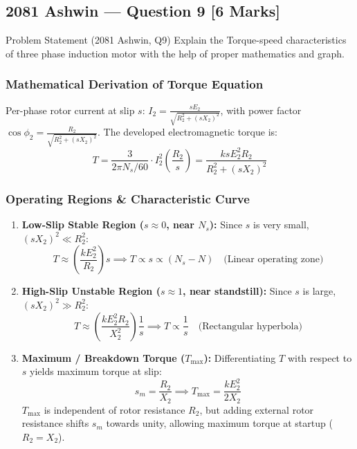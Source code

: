 \documentclass[11pt,a4paper,oneside]{article}
\begin{document}
\newpage

\subsection{2081 Ashwin --- Question 9 [6 Marks]}

\begin{questionbox}{Problem Statement (2081 Ashwin, Q9)}
Explain the Torque-speed characteristics of three phase induction motor with the help of proper mathematics and graph.
\end{questionbox}

\subsubsection*{Mathematical Derivation of Torque Equation}
Per-phase rotor current at slip $s$: $I_2 = \frac{s E_2}{\sqrt{R_2^2 + (s X_2)^2}}$, with power factor $\cos\phi_2 = \frac{R_2}{\sqrt{R_2^2 + (s X_2)^2}}$.
The developed electromagnetic torque is:
\begin{equation}
  T = \frac{3}{2\pi N_s/60} \cdot I_2^2 \left(\frac{R_2}{s}\right) = \frac{k s E_2^2 R_2}{R_2^2 + (s X_2)^2}
\end{equation}

\subsubsection*{Operating Regions \& Characteristic Curve}
\begin{enumerate}[leftmargin=1.5em]
  \item \textbf{Low-Slip Stable Region ($s \approx 0$, near $N_s$):} Since $s$ is very small, $(s X_2)^2 \ll R_2^2$:
  \[
  T \approx \left(\frac{k E_2^2}{R_2}\right) s \implies T \propto s \propto (N_s - N) \quad \text{(Linear operating zone)}
  \]
  \item \textbf{High-Slip Unstable Region ($s \approx 1$, near standstill):} Since $s$ is large, $(s X_2)^2 \gg R_2^2$:
  \[
  T \approx \left(\frac{k E_2^2 R_2}{X_2^2}\right) \frac{1}{s} \implies T \propto \frac{1}{s} \quad \text{(Rectangular hyperbola)}
  \]
  \item \textbf{Maximum / Breakdown Torque ($T_{\max}$):} Differentiating $T$ with respect to $s$ yields maximum torque at slip:
  \begin{equation}
    s_m = \frac{R_2}{X_2} \implies T_{\max} = \frac{k E_2^2}{2 X_2}
  \end{equation}
  $T_{\max}$ is independent of rotor resistance $R_2$, but adding external rotor resistance shifts $s_m$ towards unity, allowing maximum torque at startup ($R_2 = X_2$).
\end{enumerate}
\end{document}
